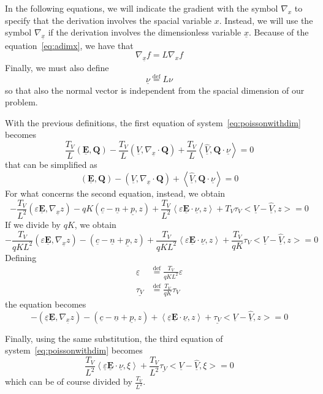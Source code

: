 \documentclass[a4paper,12pt, draft]{article}
\newcommand{\Def}{\stackrel{\mathrm{def}}{=}}
\newcommand{\efield}{\ensuremath{\mathbf{E}}}
\newcommand{\qtest}{\ensuremath{\mathbf{Q}}}
\newcommand{\ttest}{\ensuremath{\xi}}
\newcommand{\cmagn}{\ensuremath{K}}
\newcommand{\adim}[1]{\ensuremath{\underline{#1}}}
\begin{document}
In the following equations, we will indicate the gradient with the symbol $\nabla_{x}$ to specify 
that the derivation involves the spacial variable $x$. Instead, we will use the symbol 
$\nabla_{\adim{x}}$ if the derivation involves the dimensionless variable $\adim{x}$. Because of 
the equation~\ref{eq:adimx}, we have that
\[ \nabla_{\adim{x}}f = L \nabla_{x} f \]
Finally, we must also define
\[ \adim{\nu} \Def L \nu \]
so that also the normal vector is independent from the spacial dimension of our problem.

With the previous definitions, the first equation of system~\ref{eq:poissonwithdim} becomes
\[
  \frac{T_{V}}{L} \left(\adim{\efield}, \qtest \right) 
    - \frac{T_{V}}{L} \left(\adim{V},\nabla_{\adim{x}} \cdot \qtest\right) 
    + \frac{T_{V}}{L}\left<\adim{\widehat{V}}, \qtest \cdot \adim{\nu} \right>  = 0
\]
that can be simplified as
\[
  \left(\adim{\efield}, \qtest \right) - \left(\adim{V},\nabla_{\adim{x}} \cdot \qtest\right) 
    + \left<\adim{\widehat{V}}, \qtest \cdot \adim{\nu} \right>  = 0
\]
For what concerns the second equation, instead, we obtain
\[
 - \frac{T_{V}}{L^2} \left(
     \varepsilon \adim{\efield}, \nabla_{\adim{x}} z
   \right) - q \cmagn \left(\adim{c} -\adim{n} + \adim{p}, z\right) +
   \frac{T_{V}}{L^2}  \left<\varepsilon \adim{\efield} \cdot \adim{\nu}, z\right> +
   T_{V} \tau_{V} \big<\adim{V} - \adim{\widehat{V}}, z \big> = 0
\]
If we divide by $q \cmagn$, 
we obtain
\[
 - \frac{T_{V}}{q \cmagn L^2} \left(
     \varepsilon \adim{\efield}, \nabla_{\adim{x}} z
   \right) - \left(\adim{c} \! - \! \adim{n} \! + \! \adim{p}, z\right) +
   \frac{T_{V}}{q \cmagn L^2}  \left<\varepsilon \adim{\efield} \cdot \adim{\nu}, z\right> +
   \frac{T_{V}}{q \cmagn} \tau_{V} \big<\adim{V} - \adim{\widehat{V}}, z \big> = 0
\]
Defining
\begin{align*}
 \adim{\varepsilon} & \Def \frac{T_{V}}{q \cmagn L^2} \varepsilon \\
 \adim{\tau_{V}} & \Def \frac{T_{V}}{q \cmagn} \tau_{V}
\end{align*}
the equation becomes
\[
 - \left(\adim{\varepsilon} \adim{\efield}, \nabla_{\adim{x}} z \right) 
   - \left(\adim{c} - \adim{n} + \adim{p}, z\right)
   + \left<\adim{\varepsilon} \adim{\efield} \cdot \adim{\nu}, z\right>
   + \adim{\tau_{V}} \big<\adim{V} - \adim{\widehat{V}}, z \big> = 0
\]

Finally, using the same substitution, the third equation of system~\ref{eq:poissonwithdim} becomes
\[ 
  \frac{T_{V}}{L^2} \left<\adim{\varepsilon} \adim{\efield} \cdot \adim{\nu}, \ttest \right> 
    + \frac{T_{V}}{L^2} \adim{\tau_{V}} \big<\adim{V} - \adim{\widehat{V}}, \ttest \big> = 0
\]
which can be of course divided by $\frac{T_{V}}{L^2}$.
\end{document}
